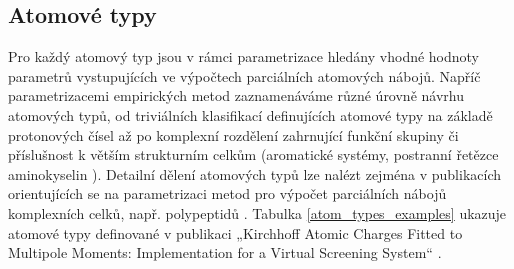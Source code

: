





\subsection{Atomové typy}
Pro každý atomový typ jsou v rámci parametrizace hledány vhodné hodnoty parametrů vystupujících ve výpočtech parciálních atomových nábojů. Napříč parametrizacemi empirických metod zaznamenáváme různé úrovně návrhu atomových typů, od triviálních klasifikací definujících atomové typy na základě protonových čísel \cite{sfkeem} až po komplexní rozdělení zahrnující funkční skupiny či příslušnost k větším strukturním celkům (aromatické systémy, postranní řetězce aminokyselin \cite{GDAC}). Detailní dělení atomových typů lze nalézt zejména v publikacích orientujících se na parametrizaci metod pro výpočet parciálních nábojů komplexních celků, např. polypeptidů \cite{attyp_peptides}. Tabulka \ref{atom_types_examples} ukazuje atomové typy definované v publikaci „Kirchhoff Atomic Charges Fitted to Multipole Moments: Implementation for a Virtual Screening System“ \cite{attyp2}.

